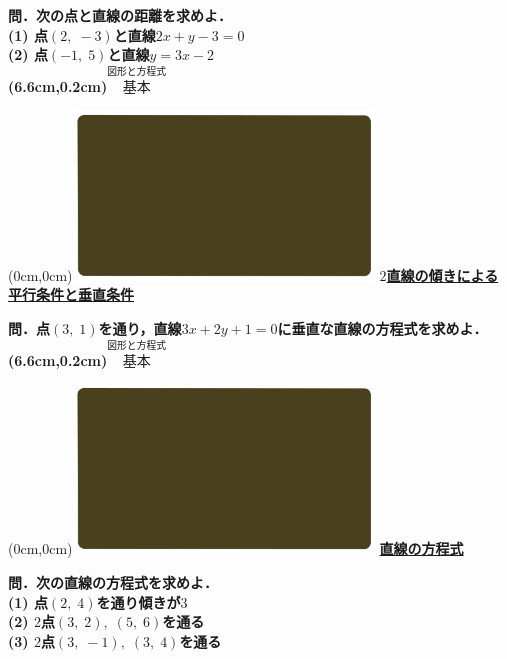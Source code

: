 \documentclass[10pt,
fleqn,
dvipdfmx,
uplatex
]{jsarticle}
\begin{document}
\Large 
\bf\boldmath 問．次の点と直線の距離を求めよ．\\
(1)  点$\left(2,\;-3\right)$と直線$2x+y-3=0$\\
(2)  点$\left(-1,\;5\right)$と直線$y=3x-2$\\

\at(6.6cm,0.2cm){\small\color{bradorange}$\overset{\text{図形と方程式}}{\text{基本}}$}


\newpage



\at(0cm,0cm){\includegraphics[width=8cm,bb=0 0 1920 1080]{./youtube/thumbnails/templates/smart_background/図形と方程式.jpeg}}
{\color{orange}\bf\boldmath\large\underline{$2$直線の傾きによる平行条件と垂直条件}}\vspace{0.3zw}

\LARGE 
\bf\boldmath 問．点$\left(3,\;1\right)$を通り，直線$3x+2y+1=0$に垂直な直線の方程式を求めよ．
\at(6.6cm,0.2cm){\small\color{bradorange}$\overset{\text{図形と方程式}}{\text{基本}}$}


\newpage



\at(0cm,0cm){\includegraphics[width=8cm,bb=0 0 1920 1080]{./youtube/thumbnails/templates/smart_background/図形と方程式.jpeg}}
{\color{orange}\bf\boldmath\huge\underline{直線の方程式}}\vspace{0.3zw}

\large 
\bf\boldmath 問．次の直線の方程式を求めよ．\\
(1)  点$\left(2,\;4\right)$を通り傾きが$3$\\
(2)  $2$点$\left(3,\;2\right),\;\left(5,\;6\right)$を通る\\
(3)  $2$点$\left(3,\;-1\right),\;\left(3,\;4\right)$を通る\\
\end{document}
